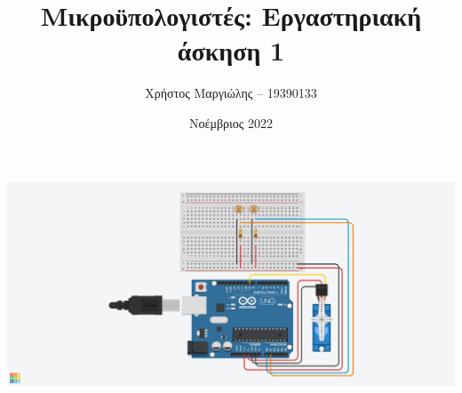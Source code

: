 \documentclass{article}
\title{Μικροϋπολογιστές: Εργαστηριακή άσκηση 1}
\author{Χρήστος Μαργιώλης -- 19390133}
\date{Νοέμβριος 2022}
\begin{document}
\begin{titlepage}
        \maketitle
\end{titlepage}

\includegraphics[width=\linewidth]{servo.png}
\pagebreak


\end{document}
